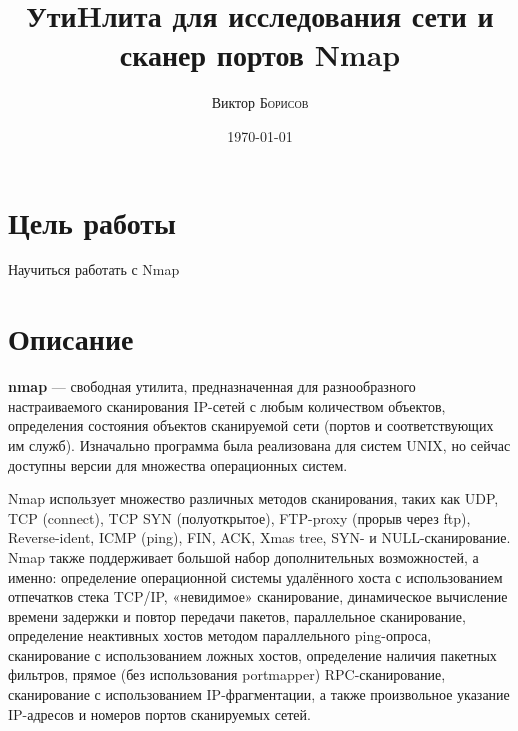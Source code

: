 \documentclass[10pt,a4paper]{article}
\title{УтиHлита для исследования сети и сканер портов Nmap} %
\author{Виктор \textsc{Борисов}} %
\date{\today} %
\begin{document}
\maketitle %

\newpage

\tableofcontents

\newpage


\section{Цель работы}

Научиться работать с Nmap



\section{Описание}

\textbf{nmap} — свободная утилита, предназначенная для разнообразного настраиваемого сканирования IP-сетей с любым количеством объектов, определения состояния объектов сканируемой сети (портов и соответствующих им служб). Изначально программа была реализована для систем UNIX, но сейчас доступны версии для множества операционных систем.

Nmap использует множество различных методов сканирования, таких как UDP, TCP (connect), TCP SYN (полуоткрытое), FTP-proxy (прорыв через ftp), Reverse-ident, ICMP (ping), FIN, ACK, Xmas tree, SYN- и NULL-сканирование. Nmap также поддерживает большой набор дополнительных возможностей, а именно: определение операционной системы удалённого хоста с использованием отпечатков стека TCP/IP, «невидимое» сканирование, динамическое вычисление времени задержки и повтор передачи пакетов, параллельное сканирование, определение неактивных хостов методом параллельного ping-опроса, сканирование с использованием ложных хостов, определение наличия пакетных фильтров, прямое (без использования portmapper) RPC-сканирование, сканирование с использованием IP-фрагментации, а также произвольное указание IP-адресов и номеров портов сканируемых сетей.
 
\end{document}
